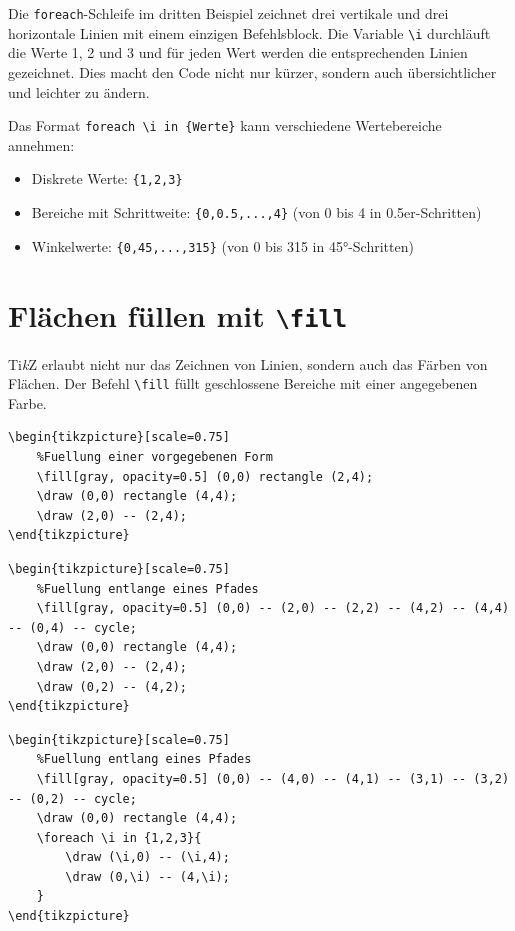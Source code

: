 Die \texttt{foreach}-Schleife im dritten Beispiel zeichnet drei vertikale und drei horizontale Linien mit einem einzigen Befehlsblock. Die Variable \texttt{\textbackslash i} durchläuft die Werte 1, 2 und 3 und für jeden Wert werden die entsprechenden Linien gezeichnet. Dies macht den Code nicht nur kürzer, sondern auch übersichtlicher und leichter zu ändern.

Das Format \texttt{foreach \textbackslash i in \{Werte\}} kann verschiedene Wertebereiche annehmen:
\begin{itemize}
	\item Diskrete Werte: \texttt{\{1,2,3\}}
    	\item Bereiche mit Schrittweite: \texttt{\{0,0.5,...,4\}} (von 0 bis 4 in 0.5er-Schritten)
    	\item Winkelwerte: \texttt{\{0,45,...,315\}} (von 0 bis 315 in 45°-Schritten)
\end{itemize}


\section{Flächen füllen mit \texttt{\textbackslash fill}}

Ti\textit{k}Z erlaubt nicht nur das Zeichnen von Linien, sondern auch das Färben von Flächen. Der Befehl \texttt{\textbackslash fill} füllt geschlossene Bereiche mit einer angegebenen Farbe.

\begin{lstlisting}[style=latex]
\begin{tikzpicture}[scale=0.75]
	%Fuellung einer vorgegebenen Form
	\fill[gray, opacity=0.5] (0,0) rectangle (2,4);
	\draw (0,0) rectangle (4,4);
	\draw (2,0) -- (2,4);
\end{tikzpicture}
\end{lstlisting}
\begin{lstlisting}[style=latex]
\begin{tikzpicture}[scale=0.75]
	%Fuellung entlange eines Pfades
	\fill[gray, opacity=0.5] (0,0) -- (2,0) -- (2,2) -- (4,2) -- (4,4) -- (0,4) -- cycle;
	\draw (0,0) rectangle (4,4);
	\draw (2,0) -- (2,4);
	\draw (0,2) -- (4,2);
\end{tikzpicture}
\end{lstlisting}

\begin{lstlisting}[style=latex]
\begin{tikzpicture}[scale=0.75]
	%Fuellung entlang eines Pfades
	\fill[gray, opacity=0.5] (0,0) -- (4,0) -- (4,1) -- (3,1) -- (3,2) -- (0,2) -- cycle;
	\draw (0,0) rectangle (4,4);
	\foreach \i in {1,2,3}{
		\draw (\i,0) -- (\i,4);
		\draw (0,\i) -- (4,\i);
	}
\end{tikzpicture}
\end{lstlisting}

